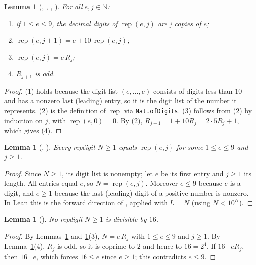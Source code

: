 \documentclass[11pt]{amsart}
\theoremstyle{plain}
\newtheorem{lemma}[theorem]{Lemma}
\theoremstyle{definition}
\newcommand{\N}{\mathbb{N}}
\newcommand{\rep}{\operatorname{rep}}
\begin{document}
\begin{lemma}[, , , ]\label{lem:rep}
For all $e,j\in\N$:
\begin{enumerate}
\item if $1\le e\le9$, the decimal digits of $\rep(e,j)$ are $j$ copies of $e$;
\item $\rep(e,j+1)=e+10\,\rep(e,j)$;
\item $\rep(e,j)=e\,R_j$;
\item $R_{j+1}$ is odd.
\end{enumerate}
\end{lemma}

\begin{proof}
(1) holds because the digit list $(e,\dots,e)$ consists of digits less than $10$ and has a nonzero last (leading) entry, so it is the digit list of the number it represents. (2) is the definition of $\rep$ via \texttt{Nat.ofDigits}. (3) follows from (2) by induction on $j$, with $\rep(e,0)=0$. By (2), $R_{j+1}=1+10R_j=2\cdot5R_j+1$, which gives (4).
\end{proof}

\begin{lemma}[, ]\label{lem:shape}
Every repdigit $N\ge1$ equals $\rep(e,j)$ for some $1\le e\le9$ and $j\ge1$.
\end{lemma}

\begin{proof}
Since $N\ge1$, its digit list is nonempty; let $e$ be its first entry and $j\ge1$ its length. All entries equal $e$, so $N=\rep(e,j)$. Moreover $e\le9$ because $e$ is a digit, and $e\ge1$ because the last (leading) digit of a positive number is nonzero. In Lean this is the forward direction of , applied with $L=N$ (using $N<10^N$).
\end{proof}

\begin{lemma}[]\label{lem:16}
No repdigit $N\ge1$ is divisible by $16$.
\end{lemma}

\begin{proof}
By Lemmas~\ref{lem:shape} and~\ref{lem:rep}(3), $N=e\,R_j$ with $1\le e\le9$ and $j\ge1$. By Lemma~\ref{lem:rep}(4), $R_j$ is odd, so it is coprime to $2$ and hence to $16=2^4$. If $16\mid eR_j$, then $16\mid e$, which forces $16\le e$ since $e\ge1$; this contradicts $e\le9$.
\end{proof}
\end{document}
